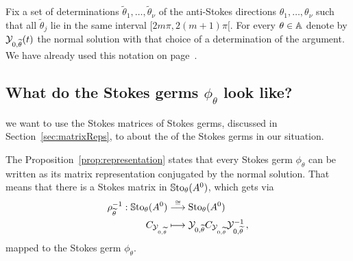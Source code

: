 Fix a set of determinations $\tilde\theta_1,\dots,\tilde\theta_\nu$ of the
anti-Stokes directions $\theta_1,\dots,\theta_\nu$ such that all
$\tilde\theta_j$ lie in the same interval $[2m\pi,2(m+1)\pi[$.
For every $\theta\in\mathbb{A}$ denote by $\mathcal{Y}_{0,\widetilde\theta}(t)$ the normal solution
with that choice of a determination of the argument. We have already used this
notation on page~\pageref{page:alreadyUsedDefn}.

\subsection{What do the Stokes germs $\phi_\theta$ look like?}
 we want to use the Stokes matrices of Stokes germs, discussed
in Section~\ref{sec:matrixReps}, to  about the
 of the Stokes germs in our situation.

The Proposition~\ref{prop:representation} states that every Stokes germ
$\phi_\theta$ can be written as its matrix representation conjugated by the
normal solution. That means that there is a Stokes matrix in
$\operatorname{\mathbb{S}to}_\theta(A^0)$, which gets via
\begin{align*}
  \rho_{\widetilde\theta}^{-1}:
  \operatorname{\mathbb{S}to}_\theta(A^0)
  &\overset{\cong}\longrightarrow
  \operatorname{Sto}_\theta(A^0)
  \\C_{\mathcal{Y}_{0,\widetilde\theta}} &\longmapsto
  \mathcal{Y}_{0,\widetilde\theta} C_{\mathcal{Y}_{0,\widetilde\theta}} \mathcal{Y}_{0,\widetilde\theta}^{-1} \,,
\end{align*}
mapped to the Stokes germ $\phi_\theta$.

